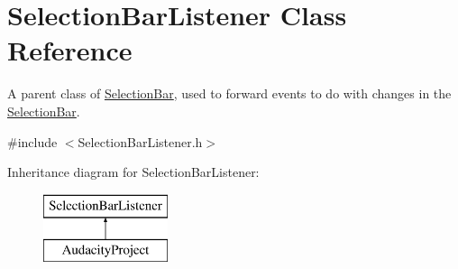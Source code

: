 \hypertarget{class_selection_bar_listener}{}\section{Selection\+Bar\+Listener Class Reference}
\label{class_selection_bar_listener}


A parent class of \hyperlink{class_selection_bar}{Selection\+Bar}, used to forward events to do with changes in the \hyperlink{class_selection_bar}{Selection\+Bar}.  




{\ttfamily \#include $<$Selection\+Bar\+Listener.\+h$>$}

Inheritance diagram for Selection\+Bar\+Listener\+:\begin{figure}[H]
\begin{center}
\leavevmode
\includegraphics[height=2.000000cm]{class_selection_bar_listener}
\end{center}
\end{figure}
